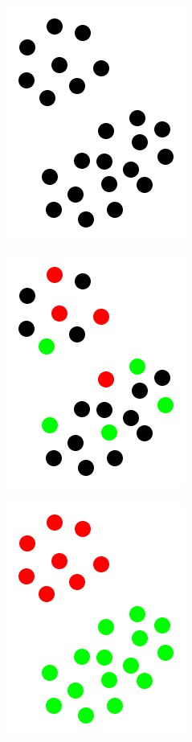 \documentclass[12pt, a4paper, pdflatex]{report}
\begin{document}
\begin{figure}[htbp]
\centering
  \begin{subfigure}[b]{0.3\textwidth}
    \centering
    \includegraphics[width=0.5\linewidth]{graphics/cluster1.png}
    \caption{\label{fig:cluster_a}}
  \end{subfigure}
  \begin{subfigure}[b]{0.3\textwidth}
    \centering
    \includegraphics[width=0.5\linewidth]{graphics/cluster2.png}
    \caption{\label{fig:cluster_b}}
  \end{subfigure}
  \begin{subfigure}[b]{0.3\textwidth}
    \centering
    \includegraphics[width=0.5\linewidth]{graphics/cluster3.png}

\end{subfigure}
\end{figure}
\end{document}
